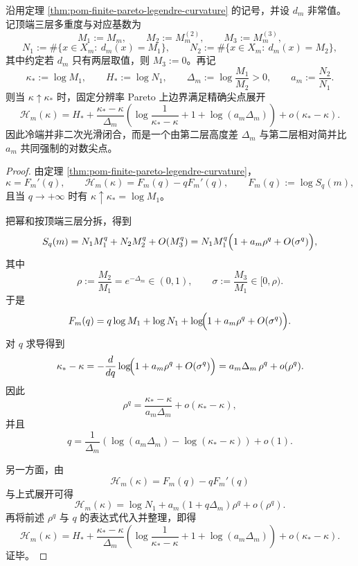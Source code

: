 \begin{theorem}\label{thm:conclusion-fixed-resolution-pareto-coldend-log-cusp}
沿用定理 \ref{thm:pom-finite-pareto-legendre-curvature} 的记号，并设 \(d_m\) 非常值。记顶端三层多重度与对应基数为
\[
M_1:=M_m,\qquad
M_2:=M_m^{(2)},\qquad
M_3:=M_m^{(3)},
\]
\[
N_1:=\#\{x\in X_m:\ d_m(x)=M_1\},
\qquad
N_2:=\#\{x\in X_m:\ d_m(x)=M_2\},
\]
其中约定若 \(d_m\) 只有两层取值，则 \(M_3:=0\)。再记
\[
\kappa_\ast:=\log M_1,
\qquad
H_\ast:=\log N_1,
\qquad
\Delta_m:=\log\frac{M_1}{M_2}>0,
\qquad
a_m:=\frac{N_2}{N_1}.
\]
则当 \(\kappa\uparrow\kappa_\ast\) 时，固定分辨率 Pareto 上边界满足精确尖点展开
\[
\mathcal H_m(\kappa)
=
H_\ast
+
\frac{\kappa_\ast-\kappa}{\Delta_m}
\left(
\log\frac1{\kappa_\ast-\kappa}
+
1+\log(a_m\Delta_m)
\right)
+
o(\kappa_\ast-\kappa).
\]
因此冷端并非二次光滑闭合，而是一个由第二层高度差 \(\Delta_m\) 与第二层相对简并比 \(a_m\) 共同强制的对数尖点。
\end{theorem}
\begin{proof}
由定理 \ref{thm:pom-finite-pareto-legendre-curvature}，
\[
\kappa=F_m'(q),
\qquad
\mathcal H_m(\kappa)=F_m(q)-qF_m'(q),
\qquad
F_m(q):=\log S_q(m),
\]
且当 \(q\to+\infty\) 时有 \(\kappa\uparrow \kappa_\ast=\log M_1\)。

把幂和按顶端三层分拆，得到
\[
S_q(m)
=
N_1M_1^q+N_2M_2^q+O(M_3^q)
=
N_1M_1^q\Bigl(1+a_m\rho^q+O(\sigma^q)\Bigr),
\]
其中
\[
\rho:=\frac{M_2}{M_1}=e^{-\Delta_m}\in(0,1),
\qquad
\sigma:=\frac{M_3}{M_1}\in[0,\rho).
\]
于是
\[
F_m(q)
=
q\log M_1+\log N_1+\log\!\Bigl(1+a_m\rho^q+O(\sigma^q)\Bigr).
\]
对 \(q\) 求导得到
\[
\kappa_\ast-\kappa
=
-\frac{d}{dq}\log\!\Bigl(1+a_m\rho^q+O(\sigma^q)\Bigr)
=
a_m\Delta_m\,\rho^q+o(\rho^q).
\]
因此
\[
\rho^q=\frac{\kappa_\ast-\kappa}{a_m\Delta_m}+o(\kappa_\ast-\kappa),
\]
并且
\[
q
=
\frac1{\Delta_m}
\left(
\log(a_m\Delta_m)-\log(\kappa_\ast-\kappa)
\right)
+o(1).
\]

另一方面，由
\[
\mathcal H_m(\kappa)=F_m(q)-qF_m'(q)
\]
与上式展开可得
\[
\mathcal H_m(\kappa)
=
\log N_1+a_m(1+q\Delta_m)\rho^q+o(\rho^q).
\]
再将前述 \(\rho^q\) 与 \(q\) 的表达式代入并整理，即得
\[
\mathcal H_m(\kappa)
=
H_\ast
+
\frac{\kappa_\ast-\kappa}{\Delta_m}
\left(
\log\frac1{\kappa_\ast-\kappa}
+
1+\log(a_m\Delta_m)
\right)
+
o(\kappa_\ast-\kappa).
\]
证毕。
\end{proof}

